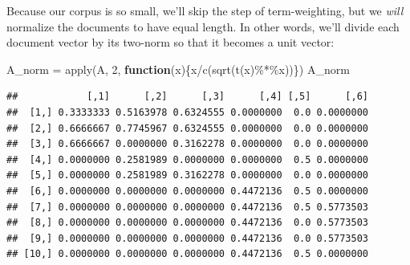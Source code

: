 \documentclass[
]{article}
\newenvironment{Shaded}{\begin{snugshade}}{\end{snugshade}}
\newcommand{\ControlFlowTok}[1]{\textcolor[rgb]{0.13,0.29,0.53}{\textbf{#1}}}
\newcommand{\DecValTok}[1]{\textcolor[rgb]{0.00,0.00,0.81}{#1}}
\newcommand{\FunctionTok}[1]{\textcolor[rgb]{0.00,0.00,0.00}{#1}}
\newcommand{\NormalTok}[1]{#1}
\newcommand{\OtherTok}[1]{\textcolor[rgb]{0.56,0.35,0.01}{#1}}
\newcommand{\SpecialCharTok}[1]{\textcolor[rgb]{0.00,0.00,0.00}{#1}}
\theoremstyle{definition}
\theoremstyle{definition}
\theoremstyle{definition}
\theoremstyle{definition}
\theoremstyle{remark}
\begin{document}
Because our corpus is so small, we'll skip the step of term-weighting, but we \emph{will} normalize the documents to have equal length. In other words, we'll divide each document vector by its two-norm so that it becomes a unit vector:

\begin{Shaded}
\begin{Highlighting}[]
\NormalTok{A\_norm }\OtherTok{=} \FunctionTok{apply}\NormalTok{(A, }\DecValTok{2}\NormalTok{, }\ControlFlowTok{function}\NormalTok{(x)\{x}\SpecialCharTok{/}\FunctionTok{c}\NormalTok{(}\FunctionTok{sqrt}\NormalTok{(}\FunctionTok{t}\NormalTok{(x)}\SpecialCharTok{\%*\%}\NormalTok{x))\})}
\NormalTok{A\_norm}
\end{Highlighting}
\end{Shaded}

\begin{verbatim}
##            [,1]      [,2]      [,3]      [,4] [,5]      [,6]
##  [1,] 0.3333333 0.5163978 0.6324555 0.0000000  0.0 0.0000000
##  [2,] 0.6666667 0.7745967 0.6324555 0.0000000  0.0 0.0000000
##  [3,] 0.6666667 0.0000000 0.3162278 0.0000000  0.0 0.0000000
##  [4,] 0.0000000 0.2581989 0.0000000 0.0000000  0.5 0.0000000
##  [5,] 0.0000000 0.2581989 0.3162278 0.0000000  0.0 0.0000000
##  [6,] 0.0000000 0.0000000 0.0000000 0.4472136  0.5 0.0000000
##  [7,] 0.0000000 0.0000000 0.0000000 0.4472136  0.5 0.5773503
##  [8,] 0.0000000 0.0000000 0.0000000 0.4472136  0.0 0.5773503
##  [9,] 0.0000000 0.0000000 0.0000000 0.4472136  0.0 0.5773503
## [10,] 0.0000000 0.0000000 0.0000000 0.4472136  0.5 0.0000000
\end{verbatim}
\end{document}
